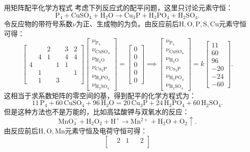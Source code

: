 \begin{example}
	{用矩阵配平化学方程式}{}
	考虑下列反应式的配平问题，这里只讨论元素守恒：
	\[
		\mathrm{P_4+CuSO_4+H_2O\to Cu_3P+H_3PO_4+H_2SO_4}.
	\]
	令反应物的带符号系数$\nu$为正、生成物的为负。由反应前后$\mathrm{H,O,P,S,Cu}$元素守恒可得：
	\[
		\begin{bmatrix}
			&&2&&3&2\\
			&4&1&&4&4\\
			4&&&1&1\\
			&1&&&&1\\
			&1&&3
		\end{bmatrix}
		\begin{bmatrix}
			\nu_\mathrm{P_4}\\\nu_\mathrm{CuSO_4}\\\nu_\mathrm{H_2O}\\\nu_\mathrm{Cu_3P}\\\nu_\mathrm{H_3PO_4}\\\nu_\mathrm{H_2SO_4}
		\end{bmatrix}
		=
		\begin{bmatrix}
			0\\0\\0\\0\\0
		\end{bmatrix}
		\implies
		\begin{bmatrix}
			\nu_\mathrm{P_4}\\\nu_\mathrm{CuSO_4}\\\nu_\mathrm{H_2O}\\\nu_\mathrm{Cu_3P}\\\nu_\mathrm{H_3PO_4}\\\nu_\mathrm{H_2SO_4}
		\end{bmatrix}
		= k\begin{bmatrix}
			11\\60\\96\\-20\\-24\\-60
		\end{bmatrix}.
	\]
	这相当于求系数矩阵的零空间的基，得到配平的化学方程式为：
	\[
		\mathrm{11\,P_4+60\,CuSO_4+96\,H_2O=20\,Cu_3P+24\,H_3PO_4+60\,H_2SO_4}.
	\]
	\tcblower
	但是这种方法也不是万能的，比如高锰酸钾与双氧水的反应：
	\[
		\mathrm{MnO_4^-+H_2O_2+H^+\to Mn^{2+}+H_2O+O_2\uparrow}.
	\]
	由反应前后$\mathrm{H,O,Mn}$元素守恒及电荷守恒可得：
	\[
		\begin{bmatrix}
			&2&1&&2\\

\end{bmatrix}\]
\end{example}
